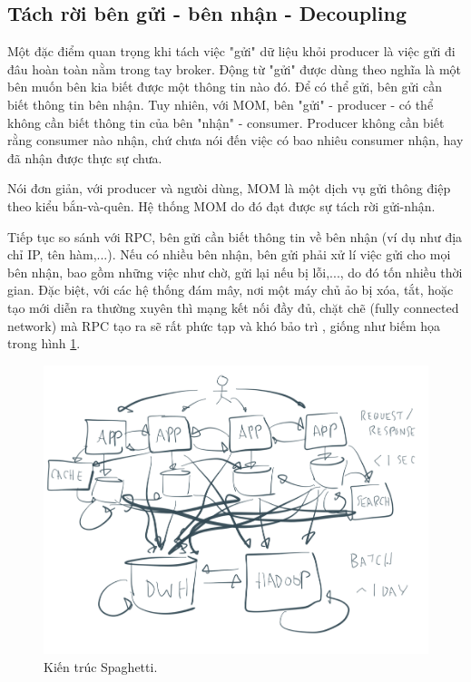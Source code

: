 \documentclass{article}
\begin{document}
\subsection{Tách rời bên gửi - bên nhận - Decoupling}

Một đặc điểm quan trọng khi tách việc "gửi" dữ liệu khỏi producer là việc gửi đi
đâu hoàn toàn nằm trong tay broker. Động từ "gửi" được dùng theo nghĩa là một
bên muốn bên kia biết được một thông tin nào đó. Để có thể gửi, bên gửi cần biết
thông tin bên nhận. Tuy nhiên, với MOM, bên "gửi" - producer - có thể không cần
biết thông tin của bên "nhận" - consumer. Producer không cần biết rằng consumer
nào nhận, chứ chưa nói đến việc có bao nhiêu consumer nhận, hay đã nhận được
thực sự chưa.

Nói đơn giản, với producer và ngưòi dùng, MOM là một dịch vụ gửi thông điệp theo
kiểu bắn-và-quên. Hệ thống MOM do đó đạt được sự tách rời gửi-nhận.

Tiếp tục so sánh với RPC, bên gửi cần biết thông tin về bên nhận (ví dụ như địa
chỉ IP, tên hàm,...). Nếu có nhiều bên nhận, bên gửi phải xử lí việc gửi cho mọi
bên nhận, bao gồm những việc như chờ, gửi lại nếu bị lỗi,..., do đó tốn nhiều
thời gian. Đặc biệt, với các hệ thống đám mây, nơi một máy chủ ảo bị xóa, tắt,
hoặc tạo mới diễn ra thường xuyên thì mạng kết nối đầy đủ, chặt chẽ (fully
connected network) mà RPC tạo ra sẽ rất phức tạp và khó bảo trì
\cite{Kleppmann17C}, giống như biếm họa trong hình
\ref{spaghetti_architectures}.

\begin{figure}[H]
    \includegraphics[scale=0.5]{spaghetti_architectures.png}
    \centering
    \caption{Kiến trúc Spaghetti\texttrademark \cite{confluent2018}.}
    \label{spaghetti_architectures}
\end{figure}
\end{document}
